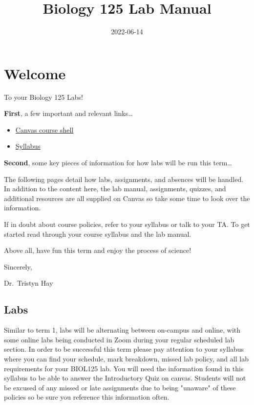 \documentclass[
]{book}
\title{Biology 125 Lab Manual}
\author{}
\date{\vspace{-2.5em}2022-06-14}
\providecommand{\tightlist}{%
  \setlength{\itemsep}{0pt}\setlength{\parskip}{0pt}}
\begin{document}
\maketitle

{
\setcounter{tocdepth}{1}
\tableofcontents
}
\hypertarget{welcome}{%
\chapter*{Welcome}\label{welcome}}

To your Biology 125 Labs!

\textbf{First}, a few important and relevant links\ldots{}

\begin{itemize}
\tightlist
\item
  \href{https://canvas.ubc.ca/courses/90148}{Canvas course shell}
\item
  \href{https://canvas.ubc.ca/courses/90148/assignments/syllabus}{Syllabus}
\end{itemize}

\textbf{Second}, some key pieces of information for how labs will be run this term\ldots{}

The following pages detail how labs, assignments, and absences will be handled. In addition to the content here, the lab manual, assignments, quizzes, and additional resources are all supplied on Canvas so take some time to look over the information.

If in doubt about course policies, refer to your syllabus or talk to your TA. To get started read through your course syllabus and the lab manual.

Above all, have fun this term and enjoy the process of science!

Sincerely,

Dr.~Tristyn Hay

\hypertarget{labs}{%
\section*{Labs}\label{labs}}

Similar to term 1, labs will be alternating between on-campus and online, with some online labs being conducted in Zoom during your regular scheduled lab section. In order to be successful this term please pay attention to your syllabus where you can find your schedule, mark breakdown, missed lab policy, and all lab requirements for your BIOL125 lab. You will need the information found in this syllabus to be able to answer the Introductory Quiz on canvas. Students will not be excused of any missed or late assignments due to being "unaware" of these policies so be sure you reference this information often.
\end{document}
